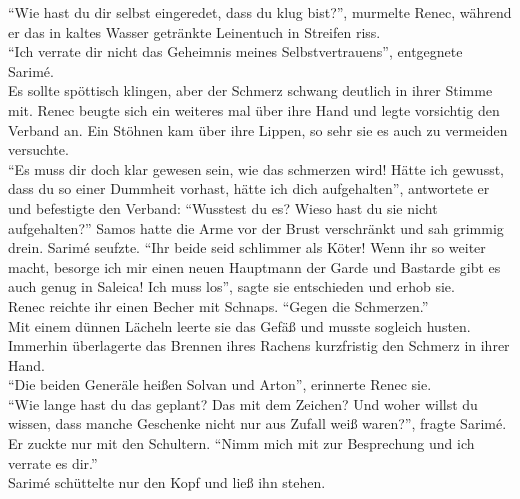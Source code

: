 ``Wie hast du dir selbst eingeredet, dass du klug bist?'', murmelte Renec, während er das in kaltes 
Wasser getränkte Leinentuch in Streifen riss.\\
``Ich verrate dir nicht das Geheimnis meines Selbstvertrauens'', entgegnete Sarimé.\\
Es sollte spöttisch klingen, aber der Schmerz schwang deutlich in ihrer Stimme mit. Renec beugte 
sich ein weiteres mal über ihre Hand und legte vorsichtig den Verband an. Ein Stöhnen kam über ihre 
Lippen, so sehr sie es auch zu vermeiden versuchte.\\
``Es muss dir doch klar gewesen sein, wie das schmerzen wird!  Hätte ich gewusst, dass du so 
einer Dummheit vorhast, hätte ich dich aufgehalten'', antwortete er und befestigte den Verband: 
``Wusstest du es? Wieso hast du sie nicht aufgehalten?''
Samos hatte die Arme vor der Brust verschränkt und sah grimmig drein. Sarimé seufzte. ``Ihr beide 
seid schlimmer als Köter! Wenn ihr so weiter macht, besorge ich mir einen neuen Hauptmann der Garde 
und Bastarde gibt es auch genug in Saleica! Ich muss los'', sagte sie entschieden und erhob sie.\\
Renec reichte ihr einen Becher mit Schnaps. ``Gegen die Schmerzen.''\\
Mit einem dünnen Lächeln leerte sie das Gefäß und musste sogleich husten. Immerhin überlagerte das 
Brennen ihres Rachens kurzfristig den Schmerz in ihrer Hand.\\
``Die beiden Generäle heißen Solvan und Arton'', erinnerte Renec sie.\\
``Wie lange hast du das geplant? Das mit dem Zeichen? Und woher willst du wissen, dass manche 
Geschenke nicht nur aus Zufall weiß waren?'', fragte Sarimé.\\
Er zuckte nur mit den Schultern. ``Nimm mich mit zur Besprechung und ich verrate es dir.''\\
Sarimé schüttelte nur den Kopf und ließ ihn stehen.\\

